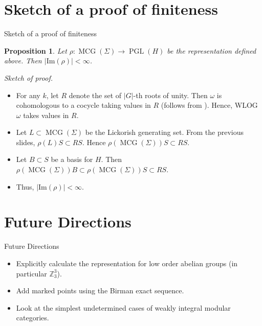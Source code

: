 \documentclass{beamer}
\renewcommand{\Im}{\mathrm{Im}}
\DeclareMathOperator{\MCG}{MCG}
\DeclareMathOperator{\PGL}{PGL}
\newtheorem{proposition}[theorem]{Proposition}
\begin{document}
\section{Sketch of a proof of finiteness}
\begin{frame}{Sketch of a proof of finiteness}
\begin{proposition}
Let $\rho: \MCG(\Sigma) \to \PGL(H)$ be the representation defined above.  Then $|\Im(\rho)| < \infty$. 
\end{proposition}

\emph{Sketch of proof.}  

\begin{itemize}
\item For any $k$, let $R$ denote the set of $|G|$-th roots of unity. Then $\omega$ is cohomologous to a cocycle taking values in $R$ (follows  from \cite[Theorem 6.58]{weibel1995introduction}).  Hence, WLOG $\omega$ takes values in $R$.

\pause \item  Let $L \subset \MCG(\Sigma)$ be the Lickorish generating set. From the previous slides,
$\rho(L) S \subset R S$. Hence $\rho(\MCG(\Sigma)) S \subset R S$. 

\pause \item Let $B \subset S$ be a basis for $H$. Then $\rho(\MCG(\Sigma)) B \subset \rho(\MCG(\Sigma)) S \subset R  S$.
 
 \pause \item   Thus, $|\Im(\rho)| < \infty$.
\end{itemize}
  
\end{frame}

\section{Future Directions}
\begin{frame}{Future Directions}
    \begin{itemize}
    \item Explicitly calculate the representation for low order abelian groups (in particular $\mathbb Z_3^3$). 
    \pause
    \item Add marked points using the Birman exact sequence.
    \pause 
    \item Look at the simplest undetermined cases of weakly integral modular categories.
    \end{itemize}
\end{frame}
\end{document}
